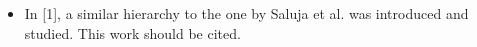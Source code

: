 \documentclass[a4paper]{article}
\begin{document}
\vspace{1em}
\begin{itemize}
	\setlength\itemsep{0.5em}
	\item In [1], a similar hierarchy to the one by Saluja et al. was introduced and studied. This work should be cited.
\end{itemize}
\end{document}
